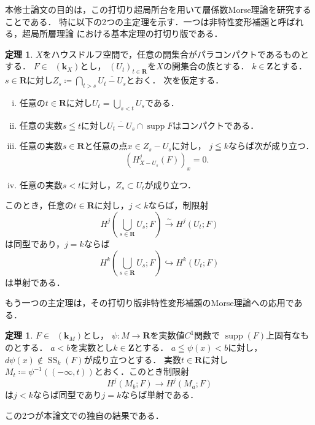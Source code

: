 ﻿\documentclass[a4paper]{jsarticle}
\theoremstyle{definition}
\newcommand{\zz}{\mathbf{Z}}
\newcommand{\rr}{\mathbf{R}}
\newcommand{\kk}{\mathbf{k}}
\numberwithin{equation}{section}
\newcommand{\supp}{\mathop{\mathrm{supp}}\nolimits}
\newcommand{\Dompl}{\mathop{\mathsf{D}^\mathrm{+}}\nolimits}
\newcommand{\Dompb}{\mathop{\mathsf{D}^\mathrm{b}}\nolimits}
\newcommand{\muS}[1][]{\mathop{\mathrm{SS}}\nolimits_{#1}}
\newcommand{\simar}{\mathrel{\overset{\sim}{\rightarrow}}}%
\theoremstyle{mystyle}
\newtheorem{THM}[AXM]{定理}
\newcommand{\smi}{-}
\begin{document}
本修士論文の目的は，この打切り超局所台を用いて層係数Morse理論を研究することである．
特に以下の2つの主定理を示す．一つは非特性変形補題と呼ばれる，超局所層理論
における基本定理の打切り版である．
\begin{THM}
  \(X\)をハウスドルフ空間で，任意の開集合がパラコンパクトであるものとする．
  \(F\in\Dompl(\kk_X)\)とし，
  \(\left(U_{t}\right)_{t\in\rr}\)を\(X\)の開集合の族とする．
  \(k\in\zz\)とする．
  \(s\in\rr\)に対し\(
    Z_{s}\coloneqq \bigcap_{t>s}\overline{U_t\smi U_s}
  \)とおく．
  次を仮定する．
  \begin{enumerate}[(i)]
    \item \label{item:t-nonchar1}
    任意の\(t\in\rr\)に対し\(U_{t}=\bigcup_{s<t}U_{s}\)である．
    \item \label{item:t-nonchar2}
    任意の実数\(s\leqq t\)に対し\(
      \overline{U_{t}\smi U_{s}}\cap \supp{F}
    \)はコンパクトである．
    \item \label{item:t-nonchar3}
    任意の実数\(s\in\rr\)と任意の点\(x\in Z_{s}\smi U_{s}\)に対し，
    \(j\leqq k\)ならば次が成り立つ．
    \[
      (H^{j}_{X\smi U_{s}}(F))_{x}=0. 
    \]
    \item \label{item:t-nonchar4} 
    任意の実数\(s< t\)に対し，\(Z_s\subset U_{t}\)が成り立つ．
  \end{enumerate}
  このとき，任意の\(t\in\rr\)に対し，\(j<k\)ならば，制限射\[
    H^{j}\left(\bigcup_{s\in\rr}U_{s};F\right)
    \simar 
    H^{j}\left(U_{t};F\right)
  \]は同型であり，\(j=k\)ならば\[
    H^{k}\left(\bigcup_{s\in\rr}U_{s};F\right)
    \hookrightarrow 
    H^{k}\left(U_{t};F\right)
  \]は単射である．
\end{THM}
もう一つの主定理は，その打切り版非特性変形補題のMorse理論への応用である．
\begin{THM}\label{thm:t-morse}
  \(F\in\Dompb(\kk_M)\)とし，
  \(\psi\colon M\to \rr\)を実数値\(C^1\)関数で
  \(\supp(F)\)上固有なものとする．
  \(a<b\)を実数とし\(k\in\zz\)とする．
  \(
    a\leqq \psi(x)<b
  \)に対し，\(d\psi(x)\notin \muS[k](F)\)が成り立つとする．
  実数\(t\in \rr\)に対し\(
    M_t\coloneqq\psi^{-1}\left((-\infty,t)\right)
  \)とおく．このとき制限射
  \[
    H^{j}(M_{b};F)\to H^{j}(M_{a};F)
  \]
  は\(j< k\)ならば同型であり\(j=k\)ならば単射である．
\end{THM}
この2つが本論文での独自の結果である．
\end{document}
